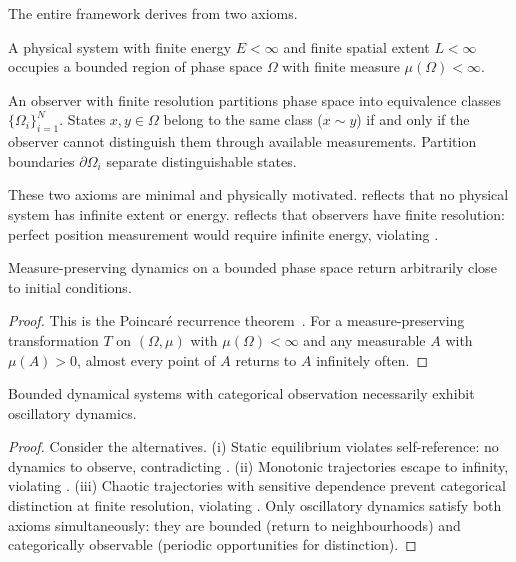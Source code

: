 The entire framework derives from two axioms.

\begin{axiom}
\label{ax:bounded}
A physical system with finite energy $E < \infty$ and finite spatial extent
$L < \infty$ occupies a bounded region of phase space $\Omega$ with finite
measure $\mu(\Omega) < \infty$.
\end{axiom}

\begin{axiom}
\label{ax:categorical}
An observer with finite resolution partitions phase space into equivalence
classes $\{\Omega_i\}_{i=1}^N$.  States $x, y \in \Omega$ belong to the same
class ($x \sim y$) if and only if the observer cannot distinguish them through
available measurements.  Partition boundaries $\partial\Omega_i$ separate
distinguishable states.
\end{axiom}

These two axioms are minimal and physically motivated.  
reflects that no physical system has infinite extent or energy.
 reflects that observers have finite resolution: perfect
position measurement would require infinite energy, violating
.

\begin{lemma}
\label{lem:recurrence}
Measure-preserving dynamics on a bounded phase space return arbitrarily close
to initial conditions.
\end{lemma}

\begin{proof}
This is the Poincar\'{e} recurrence theorem~\citep{poincare1890probleme}.  For a
measure-preserving transformation $T$ on $(\Omega, \mu)$ with
$\mu(\Omega) < \infty$ and any measurable $A$ with $\mu(A) > 0$, almost every
point of $A$ returns to $A$ infinitely often.
\end{proof}

\begin{lemma}
\label{lem:oscillatory}
Bounded dynamical systems with categorical observation necessarily exhibit
oscillatory dynamics.
\end{lemma}

\begin{proof}
Consider the alternatives.  (i) Static equilibrium violates self-reference: no
dynamics to observe, contradicting .  (ii) Monotonic
trajectories escape to infinity, violating .  (iii) Chaotic
trajectories with sensitive dependence prevent categorical distinction at
finite resolution, violating .  Only oscillatory dynamics
satisfy both axioms simultaneously: they are bounded (return to
neighbourhoods) and categorically observable (periodic opportunities for
distinction).
\end{proof}

